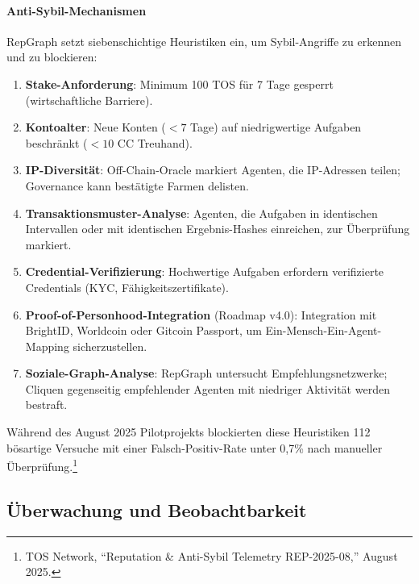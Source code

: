 \documentclass[11pt]{article}
\begin{document}
\paragraph{Anti-Sybil-Mechanismen} RepGraph setzt siebenschichtige Heuristiken ein, um Sybil-Angriffe zu erkennen und zu blockieren:
\begin{enumerate}[noitemsep]
  \item \textbf{Stake-Anforderung}: Minimum 100 TOS für 7 Tage gesperrt (wirtschaftliche Barriere).
  \item \textbf{Kontoalter}: Neue Konten ($<7$ Tage) auf niedrigwertige Aufgaben beschränkt ($<10$ CC Treuhand).
  \item \textbf{IP-Diversität}: Off-Chain-Oracle markiert Agenten, die IP-Adressen teilen; Governance kann bestätigte Farmen delisten.
  \item \textbf{Transaktionsmuster-Analyse}: Agenten, die Aufgaben in identischen Intervallen oder mit identischen Ergebnis-Hashes einreichen, zur Überprüfung markiert.
  \item \textbf{Credential-Verifizierung}: Hochwertige Aufgaben erfordern verifizierte Credentials (KYC, Fähigkeitszertifikate).
  \item \textbf{Proof-of-Personhood-Integration} (Roadmap v4.0): Integration mit BrightID, Worldcoin oder Gitcoin Passport, um Ein-Mensch-Ein-Agent-Mapping sicherzustellen.
  \item \textbf{Soziale-Graph-Analyse}: RepGraph untersucht Empfehlungsnetzwerke; Cliquen gegenseitig empfehlender Agenten mit niedriger Aktivität werden bestraft.
\end{enumerate}
Während des August 2025 Pilotprojekts blockierten diese Heuristiken 112 bösartige Versuche mit einer Falsch-Positiv-Rate unter 0,7\% nach manueller Überprüfung.\footnote{TOS Network, ``Reputation \& Anti-Sybil Telemetry REP-2025-08,'' August 2025.}

\subsection{Überwachung und Beobachtbarkeit}
\end{document}
